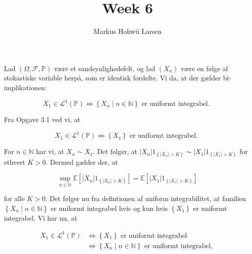 \documentclass{Class}
\author{Markus Hohwü Larsen}
\title{Week 6}
\begin{document}
 Lad $(\Omega, \mathcal{F}, \mathbb{P})$ være et sandsynlighedsfelt, og lad $\left(X_n\right)$ være en følge af stokastiske variable herpå, som er identisk fordelte. Vi da, at der gælder bi-implikationen:

$$
X_1 \in \mathcal{L}^1(\mathbb{P}) \Longleftrightarrow\left\{X_n \mid n \in \mathbb{N}\right\} \text { er uniformt integrabel. }
$$

\solution
Fra Opgave 3.1 ved vi, at

$$
X_1 \in \mathcal{L}^1(\mathbb{P}) \Longleftrightarrow\left\{X_1\right\} \text { er uniformt integrabel. }
$$


For $n \in \mathbb{N}$ har vi, at $X_n \sim X_1$. Det følger, at $\left|X_n\right| 1_{\left\{\left|X_n\right|>K\right\}} \sim\left|X_1\right| 1_{\left\{\left|X_1\right|>K\right\}}$ for ethvert $K>0$. Dermed gælder der, at

$$
\sup _{n \in \mathbb{N}} \mathbb{E}\left[\left|X_n\right| 1_{\left\{\left|X_n\right|>K\right\}}\right]=\mathbb{E}\left[\left|X_1\right| 1_{\left\{\left|X_1\right|>K\right\}}\right]
$$

for alle $K>0$. Det følger nu fra defintionen af uniform integrabilitet, at familien $\left\{X_n \mid n \in \mathbb{N}\right\}$ er uniformt integrabel hvis og kun hvis $\left\{X_1\right\}$ er uniformt integrabel. Vi har nu, at

$$
\begin{aligned}
X_1 \in \mathcal{L}^1(\mathbb{P}) & \Longleftrightarrow\left\{X_1\right\} \text { er uniformt integrabel } \\
& \Longleftrightarrow\left\{X_n \mid n \in \mathbb{N}\right\} \text { er uniformt integrabel, }
\end{aligned}
$$
\end{document}
